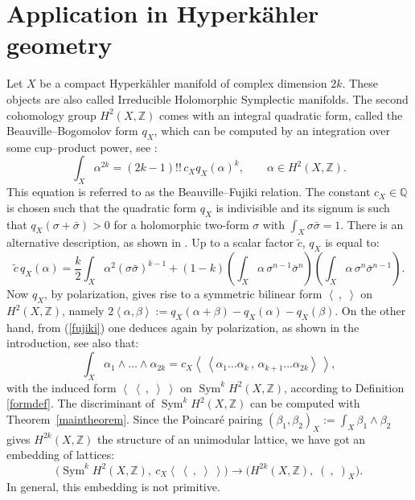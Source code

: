 \documentclass{amsart}
\DeclareMathOperator{\Sym}{Sym}
\newcommand{\coloneqq}{:=}
\newcommand{\bra}{\left<\!\!\!\:\left<}
\newcommand{\ket}{\right>\!\!\!\:\right>}
\newcommand{\Q}{\mathbb{Q}}
\newcommand{\Z}{\mathbb{Z}}
\theoremstyle{plain}
\theoremstyle{definition}
\theoremstyle{remark}
\begin{document}
\section{Application in Hyperk\"ahler geometry} \label{hyper}
Let $X$ be a compact Hyperk\"ahler manifold of complex dimension $2k$. These objects are also called Irreducible Holomorphic Symplectic manifolds. The second cohomology group $H^2(X,\Z)$ comes with an integral quadratic form, called the Beauville--Bogomolov form $q_X$, which can be computed by an integration over some cup--product power, see \cite[Subsection~2.3]{OGrady}:
\begin{equation} \label{fujiki}
\int_X \alpha ^{2k} = (2k-1)!!\,c_X q_X(\alpha)^k,\qquad \alpha\in H^2(X,\Z).
\end{equation}
This equation is referred to as the Beauville--Fujiki relation. The constant $c_X\in\Q$ is chosen such that the quadratic form $q_X$ is indivisible and its signum is such that $q_X(\sigma + \bar{\sigma}) > 0$ for a holomorphic two-form $\sigma$ with $\int_X\sigma\bar{\sigma} = 1$. There is an alternative description, as shown in \cite[Chap.~23]{Huybrechts}. Up to a scalar factor $\tilde{c}$, $q_X$ is equal to:
\begin{equation}\label{bb}
 \tilde{c}\,q_X(\alpha) = \frac{k}{2}\int_X \alpha^2 (\sigma\bar{\sigma})^{k-1} + (1-k)\left(\int_X\alpha\,\sigma^{n-1}\bar{\sigma}^{n}\right)\left(\int_X\alpha\,\sigma^{n}\bar{\sigma}^{n-1}\right).
\end{equation}
Now $q_X$, by polarization, gives rise to a symmetric bilinear form $\left<\ ,\;\right>$ on $H^2(X,\Z)$, namely $2\left<\alpha,\beta\right> \coloneqq q_X(\alpha+\beta)-q_X(\alpha) -q_X(\beta)$. On the other hand, from (\ref{fujiki}) one deduces again by polarization, as shown in the introduction, see also \cite[Eq.~3.2.4]{OGrady} that:
\begin{equation}
 \int_X \alpha_1\wedge\ldots\wedge\alpha_{2k} = c_X \bra \alpha_1\ldots\alpha_k\,,\,\alpha_{k+1}\ldots\alpha_{2k}\ket,
\end{equation}
with the induced form $\bra\ ,\;\ket$ on $\Sym^kH^2(X,\Z)$, according to Definition \ref{formdef}. The discriminant of $\Sym^kH^2(X,\Z)$ can be computed with Theorem~\ref{maintheorem}. Since the Poincar\'e pairing $(\beta_1,\beta_2)_X \coloneqq \int_X\beta_1\wedge\beta_2$ gives $H^{2k}(X,\Z)$ the structure of an unimodular lattice, we have got an embedding of lattices:
\begin{equation}
\Big( \Sym^kH^2(X,\Z),\: c_X\!\bra\ ,\;\ket\Big) \longrightarrow \Big(H^{2k}(X,\Z),\;(\ ,\;)_X\Big).
\end{equation}
In general, this embedding is not primitive.
\end{document}

